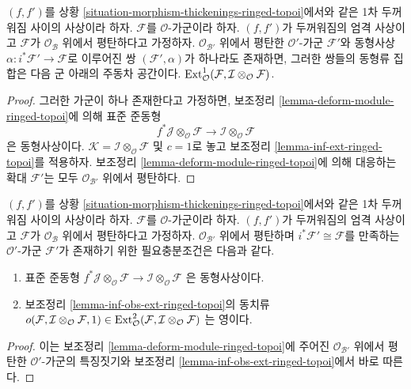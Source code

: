 \begin{lemma}
\label{lemma-inf-ext-rel-ringed-topoi}
$(f, f')$를 상황 \ref{situation-morphism-thickenings-ringed-topoi}에서와
같은 1차 두꺼워짐 사이의 사상이라 하자. $\mathcal{F}$를
$\mathcal{O}$-가군이라 하자. $(f, f')$가 두꺼워짐의 엄격 사상이고
$\mathcal{F}$가 $\mathcal{O}_\mathcal{B}$ 위에서 평탄하다고 가정하자.
$\mathcal{O}_{\mathcal{B}'}$ 위에서 평탄한 $\mathcal{O}'$-가군
$\mathcal{F}'$와 동형사상 $\alpha : i^*\mathcal{F}' \to \mathcal{F}$로
이루어진 쌍 $(\mathcal{F}', \alpha)$가 하나라도 존재하면, 그러한 쌍들의
동형류 집합은 다음 군 아래의 주동차 공간이다.
$\mathop{\mathrm{Ext}}\nolimits^1_\mathcal{O}(
\mathcal{F}, \mathcal{I} \otimes_\mathcal{O} \mathcal{F})$.
\end{lemma}

\begin{proof}
그러한 가군이 하나 존재한다고 가정하면, 보조정리
\ref{lemma-deform-module-ringed-topoi}에 의해 표준 준동형
$$
f^*\mathcal{J} \otimes_\mathcal{O} \mathcal{F} \to
\mathcal{I} \otimes_\mathcal{O} \mathcal{F}
$$
은 동형사상이다. $\mathcal{K} = 
\mathcal{I} \otimes_\mathcal{O} \mathcal{F}$ 및 $c = 1$로 놓고 보조정리
\ref{lemma-inf-ext-ringed-topoi}를 적용하자. 보조정리
\ref{lemma-deform-module-ringed-topoi}에 의해 대응하는 확대
$\mathcal{F}'$는 모두 $\mathcal{O}_{\mathcal{B}'}$ 위에서 평탄하다.
\end{proof}

\begin{lemma}
\label{lemma-inf-obs-ext-rel-ringed-topoi}
$(f, f')$를 상황 \ref{situation-morphism-thickenings-ringed-topoi}에서와
같은 1차 두꺼워짐 사이의 사상이라 하자. $\mathcal{F}$를
$\mathcal{O}$-가군이라 하자. $(f, f')$가 두꺼워짐의 엄격 사상이고
$\mathcal{F}$가 $\mathcal{O}_\mathcal{B}$ 위에서 평탄하다고 가정하자.
$\mathcal{O}_{\mathcal{B}'}$ 위에서 평탄하며
$i^*\mathcal{F}' \cong \mathcal{F}$를 만족하는 $\mathcal{O}'$-가군
$\mathcal{F}'$가 존재하기 위한 필요충분조건은 다음과 같다.
\begin{enumerate}
\item 표준 준동형
$f^*\mathcal{J} \otimes_\mathcal{O} \mathcal{F} \to
\mathcal{I} \otimes_\mathcal{O} \mathcal{F}$
은 동형사상이다.
\item 보조정리 \ref{lemma-inf-obs-ext-ringed-topoi}의 동치류
$o(\mathcal{F}, \mathcal{I} \otimes_\mathcal{O} \mathcal{F}, 1)
\in \mathop{\mathrm{Ext}}\nolimits^2_\mathcal{O}(
\mathcal{F}, \mathcal{I} \otimes_\mathcal{O} \mathcal{F})$
는 영이다.
\end{enumerate}
\end{lemma}

\begin{proof}
이는 보조정리 \ref{lemma-deform-module-ringed-topoi}에 주어진
$\mathcal{O}_{\mathcal{B}'}$ 위에서 평탄한 $\mathcal{O}'$-가군의
특징짓기와 보조정리 \ref{lemma-inf-obs-ext-ringed-topoi}에서 바로 따른다.
\end{proof}






